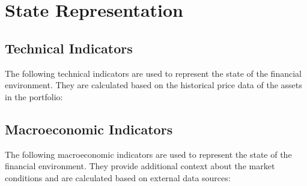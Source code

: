 \chapter{State Representation} \label{app:state_representation}

\section{Technical Indicators} \label{sec:technical-indicators}

The following technical indicators are used to represent the state of the financial environment. They are calculated based on the historical price data of the assets in the portfolio:

\section{Macroeconomic Indicators} \label{sec:macroeconomic-indicators}

The following macroeconomic indicators are used to represent the state of the financial environment. They provide additional context about the market conditions and are calculated based on external data sources:
